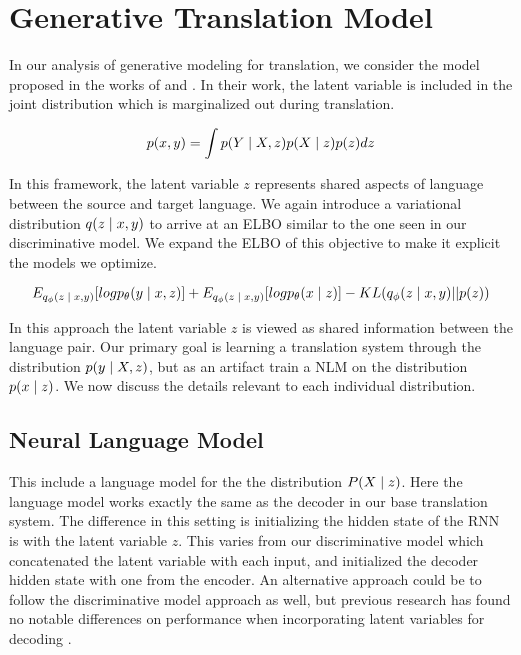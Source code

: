 \section{Generative Translation Model}

In our analysis of generative modeling for translation, we consider the model proposed in the works of \citet{eikema2018AEVNMT} and \citet{harshil2018GNMT}. In their work, the latent variable is included in the joint distribution which is marginalized out during translation.

\begin{equation}
	p(x, y) = \int p(Y \; | \;{X, z})  p(X \; | \;{z}) p(z) dz
\end{equation}

In this framework, the latent variable $z$ represents shared aspects of language between the source and target language. We again introduce a variational distribution $q( z\; | \;{x, y})$ to arrive at an ELBO similar to the one seen in our discriminative model. We expand the \ac{ELBO} of this objective to make it explicit the models we optimize.

\begin{equation}
E_{q_{\phi}(z \; | \;{x,y})} [ log p_{\theta}(y \; | \;{x, z})] +
E_{q_{\phi}(z \; | \;{x,y})} [ log p_{\theta}(x \; | \;{z})] -
	KL(q_{\phi}(z \; | \;{x,y}) || p(z))
\end{equation}

In this approach the latent variable $z$ is viewed as shared information between the language pair. Our primary goal is learning a translation system through the distribution $p(y \; | \;{X, z})$, but  as an artifact train a \ac{NLM} on the distribution $p(x \; | \;{z})$. We now discuss the details relevant to each individual distribution. 

\subsection{Neural Language Model}

This include a language model for the the distribution $P(X \; | \;{z})$. Here the language model works exactly the same as the decoder in our base translation system. The difference in this setting is initializing the hidden state of the \ac{RNN} is with the latent variable $z$. This varies from our discriminative model which concatenated the latent variable with each input, and initialized the decoder hidden state with one from the encoder. An alternative approach could be to follow the discriminative model approach as well, but  previous research has found no notable differences on performance when incorporating latent variables for decoding \cite{bowman2015GeneratingSent}. 

